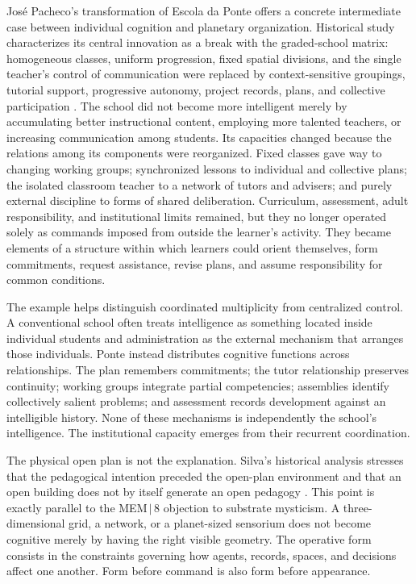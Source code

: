 \documentclass[11pt]{article}
\begin{document}
José Pacheco's transformation of Escola da Ponte offers a concrete intermediate case between individual cognition and planetary organization. Historical study characterizes its central innovation as a break with the graded-school matrix: homogeneous classes, uniform progression, fixed spatial divisions, and the single teacher's control of communication were replaced by context-sensitive groupings, tutorial support, progressive autonomy, project records, plans, and collective participation \cite{silva2020}. The school did not become more intelligent merely by accumulating better instructional content, employing more talented teachers, or increasing communication among students. Its capacities changed because the relations among its components were reorganized. Fixed classes gave way to changing working groups; synchronized lessons to individual and collective plans; the isolated classroom teacher to a network of tutors and advisers; and purely external discipline to forms of shared deliberation. Curriculum, assessment, adult responsibility, and institutional limits remained, but they no longer operated solely as commands imposed from outside the learner's activity. They became elements of a structure within which learners could orient themselves, form commitments, request assistance, revise plans, and assume responsibility for common conditions.

The example helps distinguish coordinated multiplicity from centralized control. A conventional school often treats intelligence as something located inside individual students and administration as the external mechanism that arranges those individuals. Ponte instead distributes cognitive functions across relationships. The plan remembers commitments; the tutor relationship preserves continuity; working groups integrate partial competencies; assemblies identify collectively salient problems; and assessment records development against an intelligible history. None of these mechanisms is independently the school's intelligence. The institutional capacity emerges from their recurrent coordination.

The physical open plan is not the explanation. Silva's historical analysis stresses that the pedagogical intention preceded the open-plan environment and that an open building does not by itself generate an open pedagogy \cite{silva2020}. This point is exactly parallel to the MEM\,$|$\,8 objection to substrate mysticism. A three-dimensional grid, a network, or a planet-sized sensorium does not become cognitive merely by having the right visible geometry. The operative form consists in the constraints governing how agents, records, spaces, and decisions affect one another. Form before command is also form before appearance.
\end{document}
